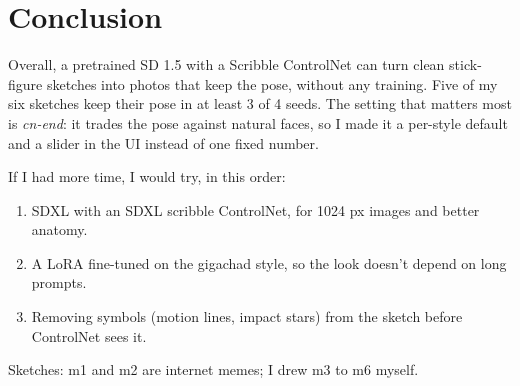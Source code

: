 \documentclass[11pt,a4paper]{article}
\newcommand{\cnend}{\textit{cn-end}}
\begin{document}
\section*{Conclusion}

Overall, a pretrained SD 1.5 with a Scribble ControlNet can turn clean stick-figure sketches into photos that
keep the pose, without any training. Five of my six sketches keep their pose in at least 3 of 4 seeds. The
setting that matters most is \cnend: it trades the pose against natural faces, so I made it a per-style default
and a slider in the UI instead of one fixed number.

If I had more time, I would try, in this order:
\begin{enumerate}
  \item SDXL with an SDXL scribble ControlNet, for 1024 px images and better anatomy.
  \item A LoRA fine-tuned on the gigachad style, so the look doesn't depend on long prompts.
  \item Removing symbols (motion lines, impact stars) from the sketch before ControlNet sees it.
\end{enumerate}

Sketches: m1 and m2 are internet memes; I drew m3 to m6 myself.
\end{document}
